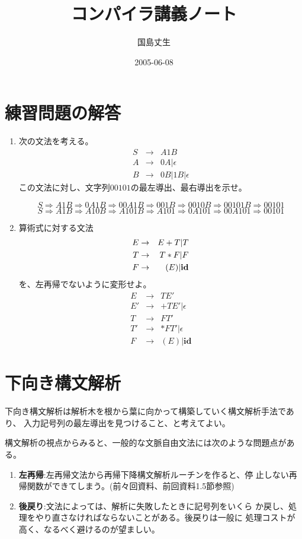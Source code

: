 \documentclass[a4j,10pt]{jsarticle}
\title{コンパイラ講義ノート}
\author{国島丈生}
\date{2005-06-08}
\begin{document}
\maketitle
\section*{練習問題の解答}
\begin{enumerate}
 \item 次の文法を考える。
       \begin{eqnarray*}
	S & \rightarrow & A1B \\
	A & \rightarrow & 0A | \epsilon \\
	B & \rightarrow & 0B | 1B | \epsilon
       \end{eqnarray*}
       この文法に対し、文字列$00101$の最左導出、最右導出を示せ。

       \[
	S \Rightarrow A1B \Rightarrow 0A1B \Rightarrow 00A1B \Rightarrow
       001B \Rightarrow 0010B \Rightarrow 00101B \Rightarrow 00101
       \]
       \[
	S \Rightarrow A1B \Rightarrow A10B \Rightarrow A101B \Rightarrow
       A101 \Rightarrow 0A101 \Rightarrow 00A101 \Rightarrow 00101
       \]
 \item 算術式に対する文法
       \begin{eqnarray*}
	E & \rightarrow & E + T | T \\
	T & \rightarrow & T * F | F \\
	F & \rightarrow & (E) | {\bf id}
       \end{eqnarray*}
       を、左再帰でないように変形せよ。
       \begin{eqnarray*}
	E & \rightarrow & TE' \\
	E' & \rightarrow & + TE' | \epsilon \\
	T & \rightarrow & FT' \\
	T' & \rightarrow & * FT' | \epsilon \\
	F & \rightarrow & (E) | \mathbf{id}
       \end{eqnarray*}
\end{enumerate}

\section{下向き構文解析}
下向き構文解析は解析木を根から葉に向かって構築していく構文解析手法であり、
入力記号列の最左導出を見つけること、と考えてよい。

構文解析の視点からみると、一般的な文脈自由文法には次のような問題点がある。
\begin{enumerate}
 \item \textbf{左再帰}:左再帰文法から再帰下降構文解析ルーチンを作ると、停
       止しない再帰関数ができてしまう。(前々回資料、前回資料1.5節参照)
 \item \textbf{後戻り}:文法によっては、解析に失敗したときに記号列をいくら
       か戻し、処理をやり直さなければならないことがある。後戻りは一般に
       処理コストが高く、なるべく避けるのが望ましい。
\end{enumerate}
\end{document}
